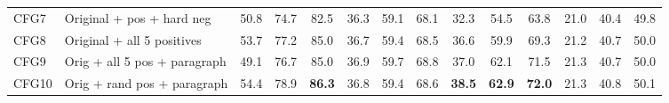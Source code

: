 \begin{table}[t]
\begin{adjustbox}{max width=\textwidth}
\begin{tabular}{llcccccccccccc}
CFG7 & Original + pos + hard neg & 50.8 & 74.7 & 82.5 & 36.3 & 59.1 & 68.1 & 32.3 & 54.5 & 63.8 & 21.0 & 40.4 & 49.8 \\
CFG8 & Original + all 5 positives & 53.7 & 77.2 & 85.0 & 36.7 & 59.4 & 68.5 & 36.6 & 59.9 & 69.3 & 21.2 & 40.7 & 50.0 \\
CFG9 & Orig + all 5 pos + paragraph & 49.1 & 76.7 & 85.0 & 36.9 & 59.7 & 68.8 & 37.0 & 62.1 & 71.5 & 21.3 & 40.7 & 50.0 \\
CFG10 & Orig + rand pos + paragraph & 54.4 & 78.9 & \textbf{86.3} & 36.8 & 59.4 & 68.6 & \textbf{38.5} & \textbf{62.9} & \textbf{72.0} & 21.3 & 40.8 & 50.1 \\
\bottomrule
\end{tabular}
\end{adjustbox}
\end{table}
